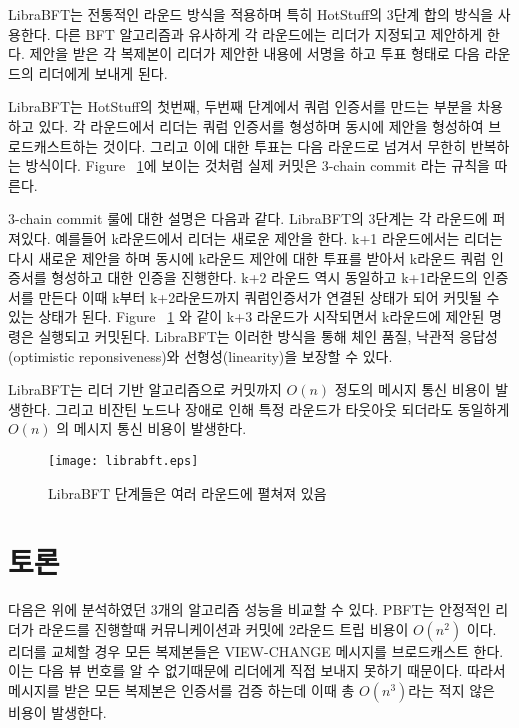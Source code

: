\documentclass[table,smallextended]{svjour3}       %
\begin{document}
LibraBFT\cite{librabft}는 전통적인 라운드 방식을 적용하며 특히 HotStuff의 3단계 합의 방식을 사용한다.
다른 BFT 알고리즘과 유사하게 각 라운드에는 리더가 지정되고 제안하게 한다. 제안을 받은 각 복제본이 리더가 제안한
내용에 서명을 하고 투표 형태로 다음 라운드의 리더에게 보내게 된다.

LibraBFT는 HotStuff\cite{yin2019hotstuff}의 첫번째, 두번째 단계에서 쿼럼 인증서를 만드는 부분을 차용하고 있다. 각 라운드에서 리더는
쿼럼 인증서를 형성하며 동시에 제안을 형성하여 브로드캐스트하는 것이다. 그리고 이에 대한 투표는 다음 라운드로 넘겨서
무한히 반복하는 방식이다. Figure ~\ref{fig:2}에 보이는 것처럼 실제 커밋은 3-chain commit 라는 규칙을 따른다.

3-chain commit 룰에 대한 설명은 다음과 같다. LibraBFT의 3단계는 각 라운드에 퍼져있다.
예를들어 k라운드에서 리더는 새로운 제안을 한다. k+1 라운드에서는 리더는 다시 새로운 제안을 하며
동시에 k라운드 제안에 대한 투표를 받아서
k라운드 쿼럼 인증서를 형성하고 대한 인증을 진행한다. k+2 라운드 역시 동일하고 k+1라운드의 인증서를 만든다
이때 k부터 k+2라운드까지 쿼럼인증서가 연결된 상태가 되어 커밋될 수 있는 상태가 된다.
Figure ~\ref{fig:2} 와 같이 k+3 라운드가 시작되면서 k라운드에 제안된 명령은 실행되고 커밋된다.
LibraBFT는 이러한 방식을 통해
체인 품질, 낙관적 응답성(optimistic reponsiveness)와 선형성(linearity)을 보장할 수 있다. 

LibraBFT는 리더 기반 알고리즘으로 커밋까지 \(O(n)\) 정도의 메시지 통신 비용이 발생한다. 그리고 비잔틴 노드나
장애로 인해 특정 라운드가 타웃아웃 되더라도 동일하게 \(O(n)\) 의 메시지 통신 비용이 발생한다.

\begin{figure}
  \texttt{[image: librabft.eps]}
\caption{LibraBFT 단계들은 여러 라운드에 펼쳐져 있음}
\label{fig:2}       %
\end{figure}

\section{토론}
\label{sec:2}

다음은 위에 분석하였던 3개의 알고리즘 성능을 비교할 수 있다. PBFT는 안정적인 리더가 라운드를 진행할때 
커뮤니케이션과 커밋에 2라운드 트립 비용이 \(O(n^{2})\) 이다.
리더를 교체할 경우 모든 복제본들은 VIEW-CHANGE 메시지를 브로드캐스트 한다. 이는 다음 뷰 번호를 알 수 없기때문에
리더에게 직접 보내지 못하기 때문이다. 따라서 메시지를 받은 모든 복제본은 인증서를 검증 하는데 이때 총 \(O(n^{3})\)라는
적지 않은 비용이 발생한다. 
\end{document}
